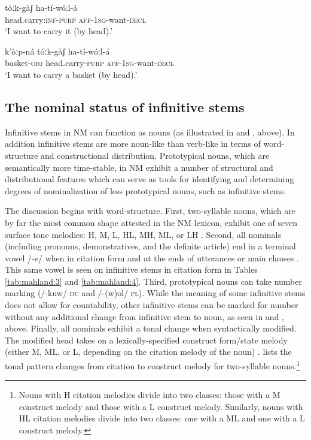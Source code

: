 \documentclass[output=paper]{langsci/langscibook}
\begin{document}
\ea\label{ex:mahland:22}
\gll tòːk-gàʃ                    ha-tí-wóːl-{\downstep}á\\
head.carry:\textsc{inf-purp}   \textsc{aff-1sg}{}-want-\textsc{decl} \\
\glt `I want to carry it (by head).'
\z

\ea\label{ex:mahland:23}
\gll k'òːp-ná      tóːk-gàʃ               ha-tí-wóːl-{\downstep}á\\
basket\textsc{{}-obj}   head.carry\textsc{{}-purp}   \textsc{aff-1sg}{}-want\textsc{{}-decl} \\
\glt `I want to carry a basket (by head).'
\z

\subsection{The nominal status of infinitive stems}\label{sec:mahland:1.4}

Infinitive stems in NM can function as nouns (as illustrated in  and , above). In addition infinitive stems are more noun-like than verb-like in terms of word-structure and constructional distribution. Prototypical nouns, which are semantically more time-stable, in NM exhibit a number of structural and distributional features which can serve as tools for identifying and determining degrees of nominalization of less prototypical nouns, such as infinitive stems. 


The discussion begins with word-structure. First, two-syllable nouns, which are by far the most common shape attested in the NM lexicon, exhibit one of seven surface tone melodies: H, M, L, HL, MH, ML, or LH \citep[23]{Ahland2009}. Second, all nominals (including pronouns, demonstratives, and the definite article) end in a terminal vowel /-e/ when in citation form and at the ends of utterances or main clauses \citep[194, 313]{AhlandM2012}. This same vowel is seen on infinitive stems in citation form in Tables \ref{tab:mahland:3} and \ref{tab:mahland:4}. Third, prototypical nouns can take number marking (/-kuw/ \textsc{du} and /-(w)ol/ \textsc{pl}). While the meaning of some infinitive stems does not allow for countability, other infinitive stems can be marked for number without any additional change from infinitive stem to noun, as seen in  and , above. Finally, all nominals exhibit a tonal change when syntactically modified. The modified head takes on a lexically-specified construct form/state melody (either M, ML, or L, depending on the citation melody of the noun) \citep[146]{AhlandM2012}.  lists the tonal pattern changes from citation to construct melody for two-syllable nouns.\footnote{Nouns with H citation melodies divide into two classes: those with a M construct melody and those with a L construct melody. Similarly, nouns with HL citation melodies divide into two classes: one with a ML and one with a L construct melody.}
\end{document}
